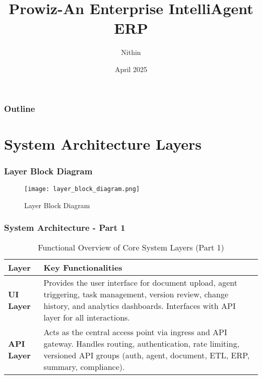 \documentclass{beamer}
\title[Prowiz]{Prowiz-An Enterprise IntelliAgent ERP}
\author[Nithin]{Nithin}
\institute[Nithin]{A collaborative effort of \textbf{Dhvani-AI}, \textbf{Cortez}, \textbf{Kavin}}
\date{April 2025}
\begin{document}
\begin{frame}
  \titlepage
\end{frame}

\begin{frame}
  \frametitle{Outline}
  \tableofcontents
\end{frame}

\section{System Architecture Layers}
\begin{frame}
    \frametitle{Layer Block Diagram}
    \begin{figure}
        \centering
        \texttt{[image: layer\_block\_diagram.png]}
        \caption{Layer Block Diagram}
        \label{fig:layer_block_diagram}
    \end{figure}
\end{frame}
\begin{frame}
  \frametitle{System Architecture - Part 1}
 \begin{table}[h!]
\centering
\renewcommand{\arraystretch}{1.2}
\begin{tabular}{|p{3cm}|p{7cm}|}
\hline
\textbf{Layer} & \textbf{Key Functionalities} \\
\hline

\textbf{UI Layer} & 
Provides the user interface for document upload, agent triggering, task management, version review, change history, and analytics dashboards. Interfaces with API layer for all interactions. \\
\hline

\textbf{API Layer} & 
Acts as the central access point via ingress and API gateway. Handles routing, authentication, rate limiting, versioned API groups (auth, agent, document, ETL, ERP, summary, compliance). \\
\hline

\end{tabular}
\caption{Functional Overview of Core System Layers (Part 1)}
\end{table}
\end{frame}
\end{document}
